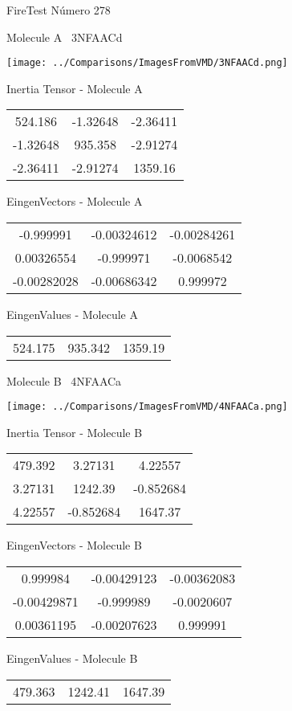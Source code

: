 \vtab[-3cm]
\begin{center}
{\large FireTest \tab Número 278}
\end{center}
\begin{multicols}{2}
\begin{center}

Molecule A \
3NFAACd

\texttt{[image: ../Comparisons/ImagesFromVMD/3NFAACd.png]}

Inertia Tensor - Molecule A \\
\begin{tabular}{|c c c|}
524.186	 & 	-1.32648	 & 	-2.36411	 \\
-1.32648	 & 	935.358	 & 	-2.91274	 \\
-2.36411	 & 	-2.91274	 & 	1359.16
\end{tabular}

\vtab
 EingenVectors - Molecule A     \\
\begin{tabular}{|c c c|}
-0.999991	 & 	-0.00324612	 & 	-0.00284261	 \\
0.00326554	 & 	-0.999971	 & 	-0.0068542	 \\
-0.00282028	 & 	-0.00686342	 & 	0.999972
\end{tabular}

\vtab
 EingenValues - Molecule A     \\
\begin{tabular}{|c c c|}
524.175	 & 	935.342	 & 	1359.19	 \\
\end{tabular}
\columnbreak

Molecule B \
4NFAACa

\texttt{[image: ../Comparisons/ImagesFromVMD/4NFAACa.png]}

Inertia Tensor - Molecule B \\
\begin{tabular}{|c c c|}
479.392	 & 	3.27131	 & 	4.22557	 \\
3.27131	 & 	1242.39	 & 	-0.852684	 \\
4.22557	 & 	-0.852684	 & 	1647.37
\end{tabular}

\vtab
 EingenVectors - Molecule B     \\
\begin{tabular}{|c c c|}
0.999984	 & 	-0.00429123	 & 	-0.00362083	 \\
-0.00429871	 & 	-0.999989	 & 	-0.0020607	 \\
0.00361195	 & 	-0.00207623	 & 	0.999991
\end{tabular}

\vtab
 EingenValues - Molecule B     \\
\begin{tabular}{|c c c|}
479.363	 & 	1242.41	 & 	1647.39	 \\
\end{tabular}

\end{center}
\end{multicols}

